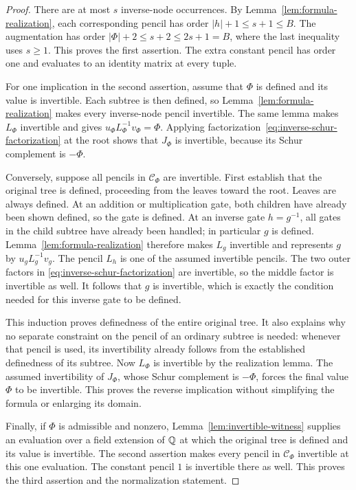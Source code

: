 \begin{proof}
There are at most $s$ inverse-node occurrences.  By
Lemma~\ref{lem:formula-realization}, each corresponding pencil has order
$|h|+1\le s+1\le B$.  The augmentation has order
$|\Phi|+2\le s+2\le2s+1=B$, where the last inequality uses $s\ge1$.
This proves the first assertion.  The extra constant pencil has order
one and evaluates to an identity matrix at every tuple.

For one implication in the second assertion, assume that
$\Phi$ is defined and its value is invertible.  Each subtree is then
defined, so Lemma~\ref{lem:formula-realization} makes every inverse-node
pencil invertible.  The same lemma makes $L_\Phi$ invertible and gives
$u_\Phi L_\Phi^{-1}v_\Phi=\Phi$.  Applying
factorization~\eqref{eq:inverse-schur-factorization} at the root shows
that $J_\Phi$ is invertible, because its Schur complement is $-\Phi$.

Conversely, suppose all pencils in $\mathcal C_\Phi$ are invertible.
First establish that the original tree is defined, proceeding from
the leaves toward the root.  Leaves are always defined.  At an addition
or multiplication gate, both children have already been shown defined,
so the gate is defined.  At an inverse gate $h=g^{-1}$, all gates in
the child subtree have already been handled; in particular $g$ is
defined.  Lemma~\ref{lem:formula-realization} therefore makes $L_g$
invertible and represents $g$ by $u_gL_g^{-1}v_g$.  The pencil $L_h$ is
one of the assumed invertible pencils.  The two outer factors in
\eqref{eq:inverse-schur-factorization} are invertible, so the middle
factor is invertible as well.  It follows that $g$ is invertible, which
is exactly the condition needed for this inverse gate to be defined.

This induction proves definedness of the entire original tree.  It
also explains why no separate constraint on the pencil of an ordinary
subtree is needed: whenever that pencil is used, its invertibility
already follows from the established definedness of its subtree.
Now $L_\Phi$ is invertible by the realization lemma.  The assumed
invertibility of $J_\Phi$, whose Schur complement is $-\Phi$, forces
the final value $\Phi$ to be invertible.  This proves the reverse
implication without simplifying the formula or enlarging its domain.

Finally, if $\Phi$ is admissible and nonzero,
Lemma~\ref{lem:invertible-witness} supplies an evaluation over a field
extension of $\mathbb Q$ at which the original tree is defined and its value
is invertible.  The second assertion makes every pencil in
$\mathcal C_\Phi$ invertible at this one evaluation.  The constant
pencil $1$ is invertible there as well.  This proves the third assertion
and the normalization statement.
\end{proof}


